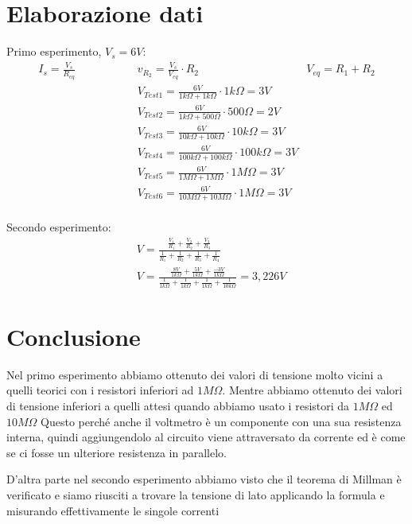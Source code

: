     
    \section{Elaborazione dati}
    Primo esperimento, $V_s = 6V$:
    \begin{align*}
        I_s = \frac{V_s}{R_{eq}}  \hspace{2cm}   & v_{R_2} = \frac{V_s}{V_{eq}} \cdot R_2  \hspace{2cm} &  V_{eq} = R_1 + R_2 \\
        & V_{Test1} = \frac{6V}{1k\Omega + 1k\Omega} \cdot 1k\Omega = 3V \\
        & V_{Test2} = \frac{6V}{1k\Omega + 500\Omega} \cdot 500\Omega = 2V \\
        & V_{Test3} = \frac{6V}{10k\Omega + 10k\Omega} \cdot 10k\Omega = 3V \\
        & V_{Test4} = \frac{6V}{100k\Omega + 100k\Omega} \cdot 100k\Omega = 3V \\
        & V_{Test5} = \frac{6V}{1M\Omega + 1M\Omega} \cdot 1M\Omega = 3V \\
        & V_{Test6} = \frac{6V}{10M\Omega + 10M\Omega} \cdot 1M\Omega = 3V \\
    \end{align*}

    Secondo esperimento:
    \begin{align*}
       & V = \frac{\frac{V_1}{R_1} + \frac{V_2}{R_2} + \frac{V_3}{R_3}}{\frac{1}{R_1} + \frac{1}{R_2} + \frac{1}{R_3} + \frac{1}{R_4}}\\
       & V = \frac{\frac{8V}{1k\Omega} + \frac{5V}{1k\Omega} + \frac{-3V}{1k\Omega}}{\frac{1}{1k\Omega} + \frac{1}{1k\Omega} + \frac{1}{1k\Omega} + \frac{1}{10k\Omega}} = 3,226V
    \end{align*}
    


    \section{Conclusione}
    Nel primo esperimento abbiamo ottenuto dei valori di tensione molto vicini a quelli teorici con i resistori inferiori ad $1M\Omega$.
    Mentre abbiamo ottenuto dei valori di tensione inferiori a quelli attesi quando abbiamo usato i resistori da $1M\Omega$ ed $10M\Omega$
    Questo perché anche il voltmetro è un componente con una sua resistenza interna, quindi aggiungendolo al circuito
    viene attraversato da corrente ed è come se ci fosse un ulteriore resistenza in parallelo.

    D'altra parte nel secondo esperimento abbiamo visto che il teorema di Millman è verificato e siamo riusciti a trovare la tensione
    di lato applicando la formula e misurando effettivamente le singole correnti 


